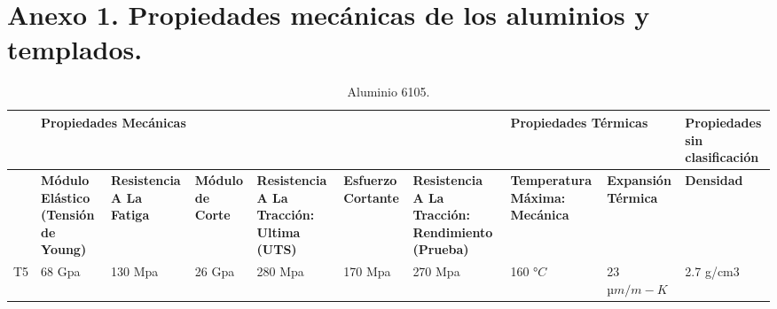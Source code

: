 \chapter{Anexo 1. Propiedades mecánicas de los aluminios y templados.}

\begin{landscape}
	\begin{table}[H]
		\centering
		\small
		\caption{Aluminio 6105.} 
		\begin{tabular}{|p{1.5em}|p{5.355em}|p{5.355em}|p{5.355em}|p{5.355em}|p{4.645em}|p{7em}|p{6.285em}|p{5.8em}|p{5.93em}|}
			\hline
			\multicolumn{1}{|r|}{} & \multicolumn{6}{p{39.995em}|}{\cellcolor[rgb]{ .851,  .882,  .949}\textbf{Propiedades Mecánicas}} & \multicolumn{2}{p{13.64em}|}{\cellcolor[rgb]{ .988,  .894,  .839}\textbf{Propiedades Térmicas}} & \cellcolor[rgb]{ 1,  .949,  .8}\textbf{Propiedades sin clasificación} \\
			\hline
			\multicolumn{1}{|r|}{} & \cellcolor[rgb]{ .851,  .882,  .949}\textbf{Módulo Elástico (Tensión de Young)} & \cellcolor[rgb]{ .851,  .882,  .949}\textbf{Resistencia A La Fatiga} & \cellcolor[rgb]{ .851,  .882,  .949}\textbf{Módulo de Corte} & \cellcolor[rgb]{ .851,  .882,  .949}\textbf{Resistencia A La Tracción: Ultima (UTS)} & \cellcolor[rgb]{ .851,  .882,  .949}\textbf{Esfuerzo Cortante} & \cellcolor[rgb]{ .851,  .882,  .949}\textbf{Resistencia A La Tracción: Rendimiento (Prueba)} & \cellcolor[rgb]{ .988,  .894,  .839}\textbf{Temperatura Máxima: Mecánica} & \cellcolor[rgb]{ .988,  .894,  .839}\textbf{Expansión Térmica} & \cellcolor[rgb]{ 1,  .949,  .8}\textbf{Densidad} \\
			\hline
			T5    & 68 Gpa & 130 Mpa & 26 Gpa & 280 Mpa & 170 Mpa & 270 Mpa & 160 $°C$ & 23  $µm/m-K$ & 2.7 g/cm3 \\
			\hline
		\end{tabular}%
		\label{tab:Alu6105}%
		
	\end{table}%


\end{landscape}
